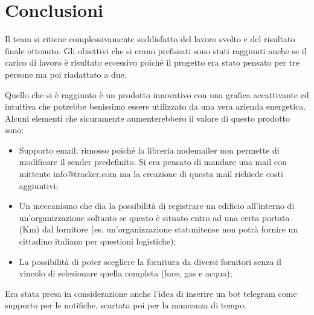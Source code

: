 \documentclass{report}
\begin{document}
\chapter{Conclusioni}
Il team si ritiene complessivamente soddisfatto del lavoro svolto e del risultato finale ottenuto.
Gli obiettivi che si erano prefissati sono stati raggiunti anche se il carico di lavoro è risultato eccessivo poiché il progetto era stato pensato per tre persone ma poi riadattato a due.
\par Quello che si è raggiunto è un prodotto innovativo con una grafica accattivante ed intuitiva che potrebbe benissimo essere utilizzato da una vera azienda energetica.
\\ Alcuni elementi che sicuramente aumenterebbero il valore di questo prodotto sono:
\begin{itemize}
\item Supporto email; rimosso poiché la libreria nodemailer non permette di modificare il sender predefinito. Si era pensato di mandare una mail con mittente info@tracker.com ma la creazione di questa mail richiede costi aggiuntivi;
\item Un meccanismo che dia la possibilità di registrare un edificio all'interno di un'organizzazione soltanto se questo è situato entro ad una certa portata (Km) dal fornitore (es. un'organizzazione statunitense non potrà fornire un cittadino italiano per questioni logistiche);
\item La possibilità di poter scegliere la fornitura da diversi fornitori senza il vincolo di selezionare quella completa (luce, gas e acqua);
\end{itemize}
Era stata presa in considerazione anche l’idea di inserire un bot telegram come supporto per le notifiche, scartata poi per la mancanza di tempo.



\end{document}

